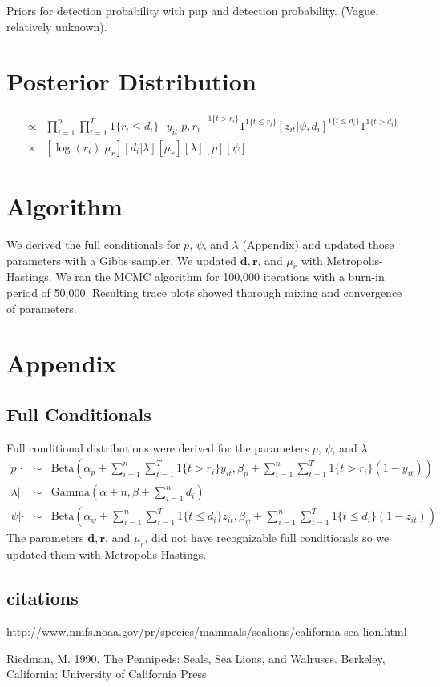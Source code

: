 \documentclass[12pt, a4paper]{article}
\begin{document}
Priors for detection probability with pup and detection probability. (Vague, relatively unknown). 

\section{Posterior Distribution}

\begin{eqnarray*}
[\log (\mathbf{r}), \mu_r, p, \mathbf{d}, \lambda, \psi | \mathbf{z}, \mathbf{y} ] & \propto & \prod_{i=1}^n \prod_{t=1} ^T  1\{r_i \leq d_i \} [y_{it}|p,r_i]^{1\{ t > r_i \}} 1^{1\{ t \leq r_i \}} [z_{it}|\psi, d_i]^{1 \{ t \leq d_i\} } 1^{1 \{ t > d_i\}} \\
  & \times & [\log(r_i)|\mu_r][d_i|\lambda]  [\mu_r][\lambda][p][\psi]
\end{eqnarray*}


\section{Algorithm}

We derived the full conditionals for $p$, $\psi$, and $\lambda$ (Appendix) and updated those parameters with a Gibbs sampler. We updated $\mathbf{d}, \mathbf{r}$, and $\mu_r$ with Metropolis-Hastings. We ran the MCMC algorithm for 100,000 iterations with a burn-in period of 50,000. Resulting trace plots showed thorough mixing and convergence of parameters. 

\section{Appendix}

\subsection{Full Conditionals} 

Full conditional distributions were derived for the parameters $p$, $\psi$, and $\lambda$:
\begin{eqnarray*}
p | \cdot & \sim & \text{Beta} \left( \alpha_p + \sum_{i=1}^n \sum_{t=1}^T 1 \{ t > r_i \} y_{it}, \beta_p + \sum_{i=1}^n \sum_{t=1}^T 1\{ t > r_i \} (1 - y_{it}) \right)  \\
\lambda | \cdot & \sim & \text{Gamma} \left( \alpha + n, \beta + \sum_{i=1}^n d_i \right) \\
\psi | \cdot & \sim & \text{Beta}\left( \alpha_{\psi} + \sum_{i=1}^n \sum_{t=1}^T 1\{t \leq d_i \} z_{it}, \beta_{\psi} + \sum_{i=1}^n \sum_{t=1}^T 1\{t \leq d_i \} (1 - z_{it}) \right) 
\end{eqnarray*}
The parameters $\mathbf{d}, \mathbf{r}$, and $\mu_r$, did not have recognizable full conditionals so we updated them with Metropolis-Hastings.  

\subsection{citations} 

http://www.nmfs.noaa.gov/pr/species/mammals/sealions/california-sea-lion.html


Riedman, M. 1990. The Pennipeds: Seals, Sea Lions, and Walruses. Berkeley, California: University of California Press. 
\end{document}

